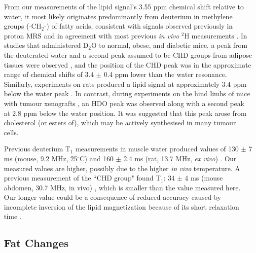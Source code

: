 From our measurements of the lipid signal’s 3.55 ppm chemical shift relative to water, it most likely originates predominantly from deuterium in methylene groups (-CH$_2$-) of fatty acids, consistent with signals observed previously in proton \ac{MRS} \cite{Ren2008CompositionTesla} and in agreement with most previous \textit{in vivo} $^2$H measurements \cite{Brereton1989TheMice}. In studies that administered D$_2$O to normal, obese, and diabetic mice, a peak from the deuterated water and a second peak assumed to be CHD groups from adipose tissues were observed \cite{Brereton1986PreliminarySpectroscopy, Brereton1989TheMice}, and the position of the CHD peak was in the approximate range of chemical shifts of 3.4 $\pm$ 0.4 ppm lower than the water resonance. Similarly, experiments on rats produced a lipid signal at approximately 3.4 ppm below the water peak \cite{Kosenkov2018TheMice}. In contrast, during experiments on the hind limbs of mice with tumour xenografts \cite{Assmann2020InCholesterol}, an \ac{HDO} peak was observed along with a second peak at 2.8 ppm below the water position. It was suggested \cite{Assmann2020InCholesterol} that this peak arose from cholesterol (or esters of), which may be actively synthesised in many tumour cells.

Previous deuterium T$_1$ measurements in muscle water produced values of 130 $\pm$ 7 ms (mouse, 9.2 MHz, 25$^\circ$C) and 160 $\pm$ 2.4 ms (rat, 13.7 MHz, \textit{ex vivo}) \cite{Block1987COMMUNICATIONSTissues}. Our measured values are higher, possibly due to the higher \textit{in vivo} temperature. A previous measurement of the ``CHD group" found T$_1$: 34 $\pm$ 4 ms (mouse abdomen, 30.7 MHz, in vivo) \cite{Brereton1986PreliminarySpectroscopy}, which is smaller than the value measured here. Our longer value could be a consequence of reduced accuracy caused by incomplete inversion of the lipid magnetization because of its short relaxation time \cite{Pfaff2017PredictingPulses}.


\subsection{Fat Changes}


